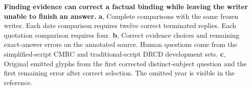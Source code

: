 \textbf{Finding evidence can correct a factual binding while leaving the writer unable to finish an answer.}
\textbf{a}, Complete comparisons with the same frozen writer. Each date comparison requires twelve correct terminated replies. Each quotation comparison requires four.
\textbf{b}, Correct evidence choices and remaining exact-answer errors on the annotated source. Human questions come from the simplified-script CMRC and traditional-script DRCD development sets.
\textbf{c}, Original emitted glyphs from the first corrected distinct-subject question and the first remaining error after correct selection. The omitted year is visible in the reference.
